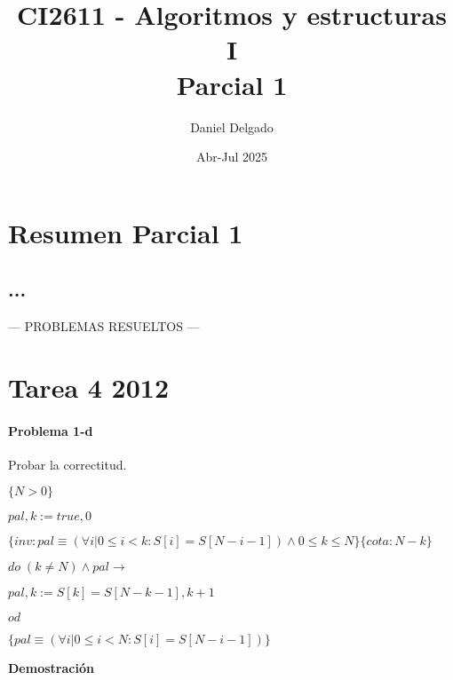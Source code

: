 \documentclass[hidelinks]{article}
\title{CI2611 - Algoritmos y estructuras I \\ Parcial 1}
\date{Abr-Jul 2025}
\author{Daniel Delgado}
\begin{document}
\maketitle

\tableofcontents

\newpage

\section{Resumen Parcial 1}

\subsection{...}\par

\newpage
\vspace*{\fill}
\hspace*{\fill} --- PROBLEMAS RESUELTOS --- \hspace*{\fill}
\vspace*{\fill}
\thispagestyle{empty}

\newpage

\section*{Tarea 4 2012}

\paragraph{Problema 1-d} \par

Probar la correctitud.\par

$\{N>0\}$\par
$pal, k := true, 0$ \par
$\{inv: pal \equiv (\forall i|0 \leq i < k : S[i]=S[N-i-1]) \land 0 \leq k \leq N\}\{cota: N-k\}$ \par
$do \; (k \neq N) \land pal \rightarrow$ \par
\hspace{1em} $pal, k := S[k]=S[N-k-1], k+1$ \par
$od$\par
$\{pal \equiv (\forall i|0 \leq i < N : S[i]=S[N-i-1])\}$ \par

\newpage

\textbf{Demostración}\par
\end{document}
